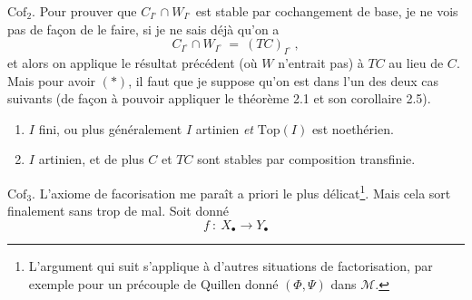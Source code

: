\documentclass[11pt]{article}
\newcommand{\M}{\mathcal{M}}
\begin{document}
$\mathrm{Cof}_2$. Pour prouver que $C_{I^\circ} \cap W_{I^\circ}$ est stable par cochangement de base, je ne vois pas de façon de le faire, si je ne sais déjà qu'on a
\[ C_{I^\circ} \cap W_{I^\circ} \ = \ (TC)_{I^\circ}\ , \tag*{$(*)$} \]
et alors on applique le résultat précédent (où $W$ n'entrait pas) à $TC$ au lieu de $C$. Mais pour avoir $(*)$, il faut que je suppose qu'on est dans l'un des deux cas suivants (de façon à pouvoir appliquer le théorème 2.1 et son corollaire 2.5).
\begin{enumerate}[leftmargin=2.5em]
\item[a)] $I$ fini, ou plus généralement $I$ artinien \textit{et} $\mathrm{Top}(I)$ est noethérien.
\item[b)] $I$ artinien, et de plus $C$ et $TC$ sont stables par composition transfinie.
\end{enumerate}
$\mathrm{Cof}_3$. L'axiome de facorisation me paraît a priori le plus délicat\footnote[15]{L'argument qui suit s'applique à d'autres situations de factorisation, par exemple pour un précouple de Quillen donné $(\Phi, \Psi)$ dans $\M$.}. Mais cela sort finalement sans trop de mal. Soit donné %
\[ f \ : \ X_\bullet \longrightarrow Y_\bullet \]
\end{document}
